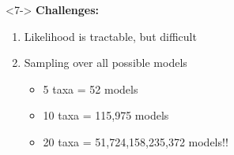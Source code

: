 \begin{frame}[t,label=fullmodel]
\begin{minipage}[t][0.45\textheight][t]{\linewidth}
        \begin{onlyenv}<7->
            \vspace{3.0mm}
            \textbf{Challenges:} \\
            \vspace{-6mm}
            \begin{enumerate}
                \item<8-> Likelihood is tractable, but difficult 
                \item<9-> Sampling over all possible models
                \begin{itemize}
                    \item<10-> 5 taxa = 52 models
                    \item<11-> 10 taxa = 115,975 models
                    \item<12-> 20 taxa = 51,724,158,235,372 models!!
                \end{itemize}
            \end{enumerate}
        \end{onlyenv}
    \end{minipage}
    \vspace{-0.5cm}
\end{frame}

